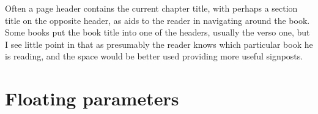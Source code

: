 Often a page header contains the current chapter title, with perhaps a section title on
the opposite header, as aids to the reader in navigating around the book. Some books put
the book title into one of the headers, usually the verso one, but I see little point in that as
presumably the reader knows which particular book he is reading, and the space would
be better used providing more useful signposts.

\section{Floating parameters}



%

\def\asidecaption{\parbox{4.2cm}{{\bfseries Image \thefigure}\par\lorem}%
}
\def\ps@caption{%
     \let\@oddfoot\@empty\let\@evenfoot\@empty%
    \def\@evenhead{%
        \begin{picture}(0,0)%
           \put(-150,-80){\asidecaption\par}%
            \stepcounter{figure}
           \put(-150,-370){\asidecaption}%
        \end{picture}%
      }%
    \let\@oddhead\@evenhead%
    \let\@mkboth\@gobbletwo%
    \let\chaptermark\@gobble%
    \let\sectionmark\@gobble%
 }

